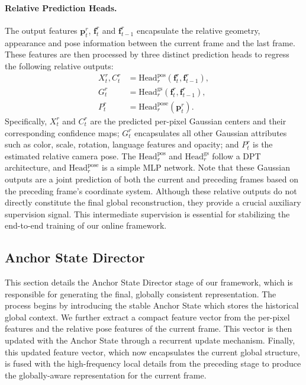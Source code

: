 \paragraph{Relative Prediction Heads.} 
The output features $\mathbf{p}^r_t$, $\mathbf{f}^r_t$ and $\mathbf{f}^r_{t-1}$ encapsulate the relative geometry, appearance and pose information between the current frame and the last frame. These features are then processed by three distinct prediction heads to regress the following relative outputs:
\begin{align}
X_t^r, C_t^r &= \text{Head}^{\text{pos}}_r(\mathbf{f}^r_t, \mathbf{f}^r_{t-1}), \\
G_t^r &= \text{Head}^{\text{gs}}_r(\mathbf{f}_t^r, \mathbf{f}_{t-1}^r), \\
P_t^r &= \text{Head}^{\text{pose}}_r(\mathbf{p}_t^r).
\end{align}
Specifically, $X_t^r$ and $C_t^r$ are the predicted per-pixel Gaussian centers and their corresponding confidence maps; $G_t^r$ encapsulates all other Gaussian attributes such as color, scale, rotation, language features and opacity; and $P^r_t$ is the estimated relative camera pose. The $\text{Head}^{\text{pos}}_r$ and $\text{Head}^{\text{gs}}_r$ follow a DPT~\cite{ranftl2021vision} architecture, and $\text{Head}^{\text{pose}}_r$ is a simple MLP network. Note that these Gaussian outputs are a joint prediction of both the current and preceding frames based on the preceding frame's coordinate system. Although these relative outputs do not directly constitute the final global reconstruction, they provide a crucial auxiliary supervision signal. This intermediate supervision is essential for stabilizing the end-to-end training of our online framework.


\subsection{Anchor State Director} 
\label{sec:global_projection}
This section details the Anchor State Director stage of our framework, which is responsible for generating the final, globally consistent representation. The process begins by introducing the stable Anchor State which stores the historical global context. We further extract a compact feature vector from the per-pixel features and the relative pose features of the current frame. This vector is then updated with the Anchor State through a recurrent update mechanism. Finally, this updated feature vector, which now encapsulates the current global structure, is fused with the high-frequency local details from the preceding stage to produce the globally-aware representation for the current frame.

